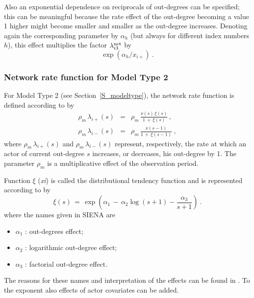 \documentclass[a4paper,fleqn]{article}
\newcommand{\+}{\, + \,}
\newcommand{\SI}{{\sf SIENA }}
\begin{document}
{\begin{enumerate}
 Also an exponential dependence on reciprocals of out-degrees can be specified;
 this can be meaningful because the rate effect of
 the out-degree becoming a value 1 higher might
 become smaller and smaller as the out-degree increases.
 Denoting again the corresponding parameter by $\alpha_h$
 (but always for different index numbers $h$),
 this effect multiplies the factor $\lambda^{\rm net}_{i3}$ by
 \[ \exp( \alpha_h / x_{i+} ) \ . \]
\end{enumerate}

\iffalse
\subsubsection{Network rate function for Model Type 2}

For Model Type 2 (see Section~\ref{S_modeltype}), the network rate
function is defined according to \citet{Snijders03} by
\begin{eqnarray*}
  \rho_m\, \lambda_{i+}(s) & = &  \rho_m\,\frac{\nu(s)\, \xi(s)}{1 \,+\, \xi(s)}\, , \\
  \rho_m\, \lambda_{i-}(s) & = &  \rho_m\, \frac{\nu(s-1)}{1 \,+\, \xi(s-1)} \ ,
\end{eqnarray*}
where $ \rho_m\,\lambda_{i+}(s)$ and $ \rho_m\,\lambda_{i-}(s)$
represent, respectively, the rate at which an actor of current
out-degree $s$ increases, or decreases, his out-degree by 1. The
parameter $\rho_m$ is a multiplicative effect of the observation
period.

Function $\xi$ (\emph{xi}) is called the distributional tendency
function and is represented according to \citet[formula (17)]{Snijders03} by
\[ \xi(s) \,=\, \exp\left(\alpha_1 \,-\, \alpha_2 \log(s+1) - \frac{\alpha_3}{s+1}\right)  \ . \]
where the names given in \SI are
\begin{itemize}
 \item $\alpha_1$ : out-degrees effect;
 \item $\alpha_2$ : logarithmic out-degree effect;
 \item $\alpha_3$ : factorial out-degree effect.
\end{itemize}
The reasons for these names and interpretation of the effects
can be found in \citet{Snijders03}.
To the exponent also effects of actor covariates can be added.

}
\end{document}
